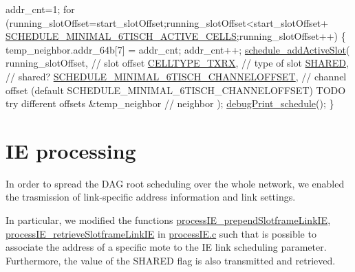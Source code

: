 \begin{DoxyCodeInclude}
    addr\_cnt=1;
    \textcolor{keywordflow}{for} (running\_slotOffset=start\_slotOffset;running\_slotOffset<start\_slotOffset+
      \hyperlink{group___schedule_ga299d7e29eb70888b68ace83fd3f1a8df}{SCHEDULE\_MINIMAL\_6TISCH\_ACTIVE\_CELLS};running\_slotOffset++) \{
        temp\_neighbor.addr\_64b[7]   = addr\_cnt;
        addr\_cnt++;
      \hyperlink{group___schedule_ga00825b0f7040c67065d65aadde478241}{schedule\_addActiveSlot}(
         running\_slotOffset,                 \textcolor{comment}{// slot offset}
         \hyperlink{group___schedule_ggad8490d4fdf8cef27f7e5fa6a37046a3da703f29e4d2b16980f09eceaeb7a35281}{CELLTYPE\_TXRX},                      \textcolor{comment}{// type of slot}
         \hyperlink{group___schedule_ga884c794595c4aa480df9022648c29564}{SHARED},                               \textcolor{comment}{// shared?}
         \hyperlink{group___schedule_ga485a603a3e03059901c4fc5fc968a1e9}{SCHEDULE\_MINIMAL\_6TISCH\_CHANNELOFFSET},    \textcolor{comment}{// channel offset
       (default SCHEDULE\_MINIMAL\_6TISCH\_CHANNELOFFSET) TODO try different offsets}
         &temp\_neighbor                      \textcolor{comment}{// neighbor}
      );
      \hyperlink{group___schedule_gafbaaa0f57ce9c382c0fc00225a7b2078}{debugPrint\_schedule}();
   \}
\end{DoxyCodeInclude}
 

 \hypertarget{_l_k_n_contribution_IE_processing}{}\section{I\+E processing}\label{_l_k_n_contribution_IE_processing}
In order to spread the D\+AG root scheduling over the whole network, we enabled the trasmission of link-\/specific address information and link settings.

In particular, we modified the functions \hyperlink{process_i_e_8h_a222b2d57ad09b945b098f211cd159e53}{process\+I\+E\+\_\+prepend\+Slotframe\+Link\+IE}, \hyperlink{process_i_e_8h_a41d90fd25e8ce294b9d7632d43089c80}{process\+I\+E\+\_\+retrieve\+Slotframe\+Link\+IE} in \hyperlink{process_i_e_8c}{process\+I\+E.\+c} such that is possible to associate the address of a specific mote to the IE link scheduling parameter. Furthermore, the value of the S\+H\+A\+R\+ED flag is also transmitted and retrieved.

